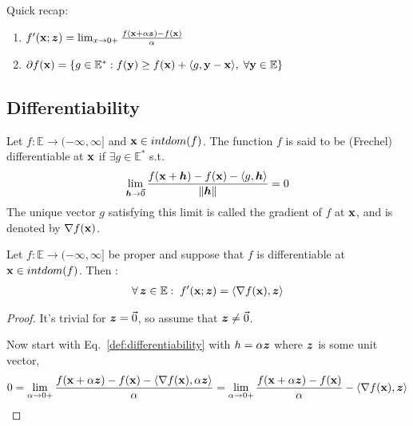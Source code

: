 \documentclass[11pt]{article}
\begin{document}
Quick recap:
\begin{enumerate}
    \item $f'({\mathbf{x}}; {\bm{z}}) = \lim_{x \to 0+}\frac{f({\mathbf{x}} + \alpha{\bm{z}}) - f({\mathbf{x}})}{\alpha}$
    \item $\partial f({\mathbf{x}}) = \{ g \in \mathbb{E}^{*}: f({\mathbf{y}}) \ge f({\mathbf{x}}) + \langle g,{\mathbf{y}}-{\mathbf{x}} \rangle
    ,\; \forall {\mathbf{y}} \in \mathbb{E} \}$
\end{enumerate}

\subsection{Differentiability}
\begin{definition}
    Let $f: \mathbb{E} \to (-\infty, \infty]$ and ${\mathbf{x}} \in intdom(f)$. The function $f$ is said to be 
    (Frechel) differentiable at ${\mathbf{x}}$ if $\exists g \in \mathbb{E}^{*}$ s.t.
    \begin{align} \label{def:differentiability}
        \lim_{{\bm{h}} \to \vec{0}} \frac{f({\mathbf{x}} + {\bm{h}}) - f({\mathbf{x}}) - \langle g,{\bm{h}} \rangle}{\| {\bm{h}} \| } = 0
    \end{align}
    The unique vector $g$ satisfying this limit is called the gradient of $f$ at ${\mathbf{x}}$, and is denoted 
    by $\nabla f({\mathbf{x}})$.
\end{definition}

\begin{theorem}
    Let $f: \mathbb{E} \to (-\infty,\infty]$ be proper and suppose that 
    $f$ is differentiable at ${\mathbf{x}} \in intdom(f)$. Then :
    \begin{align*}
        \forall \, {\bm{z}} \in \mathbb{E}: \; 
        f'({\mathbf{x}}; {\bm{z}}) = \langle \nabla f({\mathbf{x}}), {\bm{z}} \rangle
    \end{align*}
\end{theorem}
\begin{proof}
    It's trivial for ${\bm{z}} = \vec{0}$, so assume that ${\bm{z}} \neq \vec{0}$.

    Now start with Eq.~\eqref{def:differentiability} with $h = \alpha {\bm{z}}$ where ${\bm{z}}$ is some unit 
    vector, 
    \begin{align*}
        0 = \lim_{\alpha \to 0+}\frac{f({\mathbf{x}} + \alpha{\bm{z}}) - f({\mathbf{x}}) - \langle \nabla f({\mathbf{x}}), \alpha {\bm{z}} \rangle}
        {\alpha} = \lim_{\alpha \to 0+}\frac{f({\mathbf{x}} + \alpha {\bm{z}}) - f({\mathbf{x}})}{\alpha} 
            - \langle \nabla f({\mathbf{x}}), {\bm{z}} \rangle
    \end{align*}
\end{proof}
\end{document}
